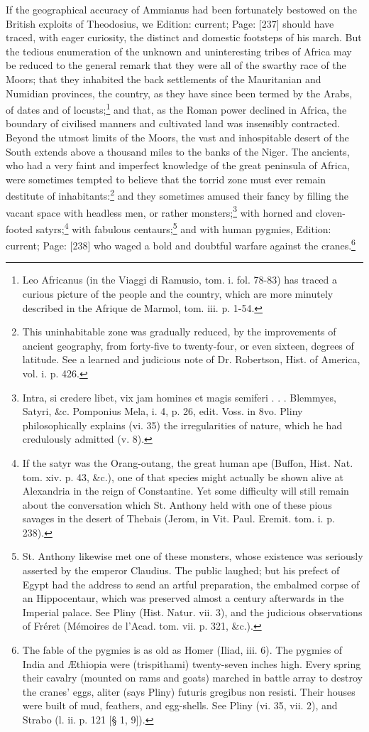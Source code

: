 If the geographical accuracy of Ammianus had been fortunately bestowed on the British exploits of Theodosius, we Edition: current; Page: [237] should have traced, with eager curiosity, the distinct and domestic footsteps of his march. But the tedious enumeration of the unknown and uninteresting tribes of Africa may be reduced to the general remark that they were all of the swarthy race of the Moors; that they inhabited the back settlements of the Mauritanian and Numidian provinces, the country, as they have since been termed by the Arabs, of dates and of locusts;\footnote{Leo Africanus (in the Viaggi di Ramusio, tom. i. fol. 78-83) has traced a curious picture of the people and the country, which are more minutely described in the Afrique de Marmol, tom. iii. p. 1-54.} and that, as the Roman power declined in Africa, the boundary of civilised manners and cultivated land was insensibly contracted. Beyond the utmost limits of the Moors, the vast and inhospitable desert of the South extends above a thousand miles to the banks of the Niger. The ancients, who had a very faint and imperfect knowledge of the great peninsula of Africa, were sometimes tempted to believe that the torrid zone must ever remain destitute of inhabitants:\footnote{This uninhabitable zone was gradually reduced, by the improvements of ancient geography, from forty-five to twenty-four, or even sixteen, degrees of latitude. See a learned and judicious note of Dr. Robertson, Hist. of America, vol. i. p. 426.} and they sometimes amused their fancy by filling the vacant space with headless men, or rather monsters;\footnote{Intra, si credere libet, vix jam homines et magis semiferi . . . Blemmyes, Satyri, \&c. Pomponius Mela, i. 4, p. 26, edit. Voss. in 8vo. Pliny philosophically explains (vi. 35) the irregularities of nature, which he had credulously admitted (v. 8).} with horned and cloven-footed satyrs;\footnote{If the satyr was the Orang-outang, the great human ape (Buffon, Hist. Nat. tom. xiv. p. 43, \&c.), one of that species might actually be shown alive at Alexandria in the reign of Constantine. Yet some difficulty will still remain about the conversation which St. Anthony held with one of these pious savages in the desert of Thebais (Jerom, in Vit. Paul. Eremit. tom. i. p. 238).} with fabulous centaurs;\footnote{St. Anthony likewise met one of these monsters, whose existence was seriously asserted by the emperor Claudius. The public laughed; but his prefect of Egypt had the address to send an artful preparation, the embalmed corpse of an Hippocentaur, which was preserved almost a century afterwards in the Imperial palace. See Pliny (Hist. Natur. vii. 3), and the judicious observations of Fréret (Mémoires de l\texthebrew{}’Acad. tom. vii. p. 321, \&c.).} and with human pygmies, Edition: current; Page: [238] who waged a bold and doubtful warfare against the cranes.\footnote{The fable of the pygmies is as old as Homer (Iliad, iii. 6). The pygmies of India and Æthiopia were (trispithami) twenty-seven inches high. Every spring their cavalry (mounted on rams and goats) marched in battle array to destroy the cranes\texthebrew{}’ eggs, aliter (says Pliny) futuris gregibus non resisti. Their houses were built of mud, feathers, and egg-shells. See Pliny (vi. 35, vii. 2), and Strabo (l. ii. p. 121 [§ 1, 9]).} 